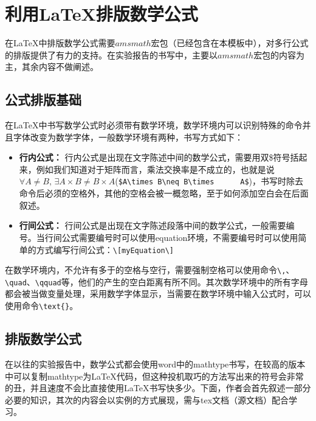 \section{利用\LaTeX 排版数学公式}
在\LaTeX 中排版数学公式需要$amsmath$宏包（已经包含在本模板中），对多行公式的排版提供了有力的支持。在实验报告的书写中，主要以$amsmath$宏包的内容为主，其余内容不做阐述。
\subsection{公式排版基础}
在\LaTeX 中书写数学公式时必须带有数学环境，数学环境内可以识别特殊的命令并且字体改变为数学字体，一般数学环境有两种，书写方式如下：
\begin{itemize}
\item \textbf{行内公式：} 行内公式是出现在文字陈述中间的数学公式，需要用双\$符号括起来，例如我们知道对于矩阵而言，乘法交换率是不成立的，也就是说$\forall A\neq B,\, \exists A\times B\neq B\times      A$(\verb|$A\times B\neq B\times      A$|)，书写时除去命令后必须的空格外，其他的空格会被一概忽略，至于如何添加空白会在后面叙述。
\item \textbf{行间公式：} 行间公式是出现在文字陈述段落中间的数学公式，一般需要编号。当行间公式需要编号时可以使用equation环境，不需要编号时可以使用简单的方式编写行间公式：\verb|\[myEquation\]|
\end{itemize}

在数学环境内，不允许有多于的空格与空行，需要强制空格可以使用命令\verb|\,|、\verb|\quad|、\verb|\qquad|等，他们的产生的空白距离有所不同。其次数学环境中的所有字母都会被当做变量处理，采用数学字体显示，当需要在数学环境中输入公式时，可以使用命令\verb|\text{}|。
\subsection{排版数学公式}
在以往的实验报告中，数学公式都会使用word中的mathtype书写，在较高的版本中可以复制mathtype为\LaTeX 代码，但这种投机取巧的方法写出来的符号会非常的丑，并且速度不会比直接使用\LaTeX 书写快多少。下面，作者会首先叙述一部分必要的知识，其次的内容会以实例的方式展现，需与tex文档（源文档）配合学习。

